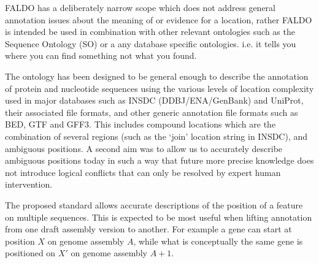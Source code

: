 FALDO has a deliberately narrow scope which does not address general annotation
issues about the meaning of or evidence for a location, rather FALDO is intended be
used in combination with other relevant ontologies such as the Sequence Ontology
(SO) \cite{SequenceOntology2005} or a any database specific ontologies. 
i.e. it tells you where you can find something not what you found.

The ontology has been designed to be general enough to describe the annotation
of protein and nucleotide sequences using the various levels of location complexity used
in major databases such as INSDC (DDBJ/ENA/GenBank) and UniProt, their
associated file formats, and other generic annotation file formats such as BED,
GTF and GFF3. This includes compound locations which are the combination of
several regions (such as the `join' location string in INSDC), and ambiguous
positions. A second aim was to allow us to accurately describe ambiguous positions today
in such a way that future more precise knowledge does not introduce logical conflicts 
that can only be resolved by expert human intervention.

The proposed standard allows accurate descriptions of the position of a feature on multiple sequences.
This is expected to be most useful when lifting annotation from one draft assembly version to another.
For example a gene can start at position $X$ on genome assembly $A$,
while what is conceptually the same gene is positioned on $X'$ on genome assembly $A+1$.

